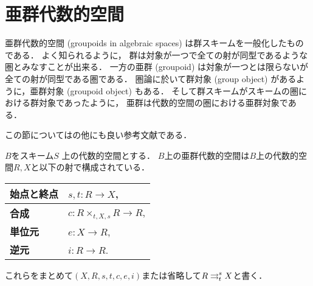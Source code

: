 \section{亜群代数的空間}
    亜群代数的空間 (groupoids in algebraic spaces) は群スキームを一般化したものである．
    よく知られるように，
    群は対象が一つで全ての射が同型であるような圏とみなすことが出来る．
    一方の亜群 (groupoid) は対象が一つとは限らないが全ての射が同型である圏である．
    圏論に於いて群対象 (group object) があるように，亜群対象 (groupoid object) もある．
    そして群スキームがスキームの圏における群対象であったように，
    亜群は代数的空間の圏における亜群対象である．

    この節については\cite{SP, Olsson16}の他に\cite{Rydh13}も良い参考文献である．

    \begin{Def}
        $B$をスキーム$S$
        上の代数的空間とする．
        $B$上の亜群代数的空間は$B$上の代数的空間$R,X$と以下の射で構成されている．
        \begin{center}
        \begin{tabular}{ll}
            \textbf{始点と終点} & $s,t \colon R \to X$, \\ \hline
            \textbf{合成}       & $c \colon R \times_{t,X,s} R \to R$, \\ \hline
            \textbf{単位元}     & $e \colon X \to R$, \\ \hline
            \textbf{逆元}       & $i \colon R \to R$.
        \end{tabular}
        \end{center}
        これらをまとめて$(X,R,s,t,c,e,i)$または省略して$R \mathrel{\mathop{\rightrightarrows}^{s}_{t}} X$と書く．


\end{Def}

